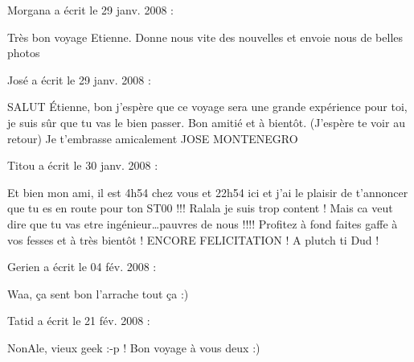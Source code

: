 \medskip
Morgana a écrit le 29 janv. 2008 :
\begin{displayquote}
Très bon voyage Etienne. Donne nous vite des nouvelles et envoie nous de belles photos
\end{displayquote}

\medskip
José a écrit le 29 janv. 2008 :
\begin{displayquote}
SALUT Étienne, bon j'espère que ce voyage sera une grande expérience pour toi, je suis sûr que tu vas le bien passer.
 Bon amitié et à bientôt. (J'espère te voir au retour)
 Je t'embrasse amicalement JOSE MONTENEGRO
\end{displayquote}

\medskip
Titou a écrit le 30 janv. 2008 :
\begin{displayquote}
Et bien mon ami, il est 4h54 chez vous et 22h54 ici et j'ai le plaisir de t'annoncer que tu es en route pour ton ST00 !!! Ralala je suis trop content ! Mais ca veut dire que tu vas etre ingénieur\dots pauvres de nous !!!! Profitez à fond faites gaffe à vos fesses et à très bientôt ! ENCORE FELICITATION ! A plutch ti Dud !
\end{displayquote}

\medskip
Gerien a écrit le 04 fév. 2008 :
\begin{displayquote}
Waa, ça sent bon l'arrache tout ça :)
\end{displayquote}

\medskip
Tatid a écrit le 21 fév. 2008 :
\begin{displayquote}
NonAle, vieux geek :-p !
Bon voyage à vous deux :)
\end{displayquote}

\vfill
